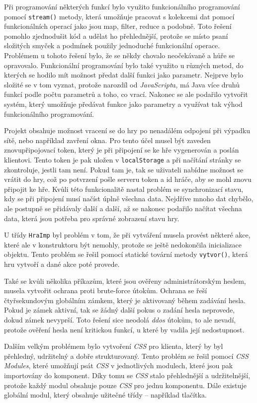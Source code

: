 Při programování některých funkcí bylo využito funkcionálního programování pomocí \texttt{stream()} metody, která umožňuje pracovat s kolekcemi dat pomocí funkcionálních operací jako jsou map, filter, reduce a podobně. Toto řešení pomohlo zjednodušit kód a udělat ho přehlednější, protože se místo psaní složitých smyček a podmínek použily jednoduché funkcionální operace. Problémem u tohoto řešení bylo, že se někdy chovalo neočekávaně a hůře se opravovalo. Funkcionální programování bylo také využito u různých metod, do kterých se hodilo mít možnost předat další funkci jako parametr. Nejprve bylo složité se v tom vyznat, protože narozdíl od \emph{JavaScript}u, má Java více druhů funkcí podle počtu parametrů a toho, co vrací. Nakonec se ale podařilo vytvořit systém, který umožňuje předávat funkce jako parametry a využívat tak výhod funkcionálního programování.

Projekt obsahuje možnost vracení se do hry po nenadálém odpojení při výpadku sítě, nebo například zavření okna. Pro tento účel musel být zaveden znovupřipojovací token, který je při připojení se ke hře vygenerován a poslán klientovi. Tento token je pak uložen v \texttt{localStorage} a při načítání stránky se zkontroluje, jestli tam není. Pokud tam je, tak se uživateli nabídne možnost se vrátit do hry, což po potvrzení pošle serveru token a id hráče, aby se mohl znovu připojit ke hře. Kvůli této funkcionalitě nastal problém se synchronizací stavu, kdy se při připojení musí načíst úplně všechna data. Nejdříve mnoho dat chybělo, ale postupně se přidávaly další a další, až se nakonec podařilo načítat všechna data, která jsou potřeba pro správné zobrazení stavu hry.

U třídy \texttt{HraImp} byl problém v tom, že při vytváření musela provést některé akce, které ale v konstruktoru být nemohly, protože se ještě nedokončila inicializace objektu. Tento problém se řešil pomocí statické tovární metody \texttt{vytvor()}, která hru vytvoří a dané akce poté provede.

Také se kvůli několika příkazům, které jsou ověřeny administrátorským heslem, musela vytvořit ochrana proti brute-force útokům. Ochrana se řeší čtyřsekundovým globálním zámkem, který je aktivovaný během zadávání hesla. Pokud je zámek aktivní, tak se žádný další pokus o zadání hesla neprovede, dokud zámek nevyprší. Toto řešení sice neodolá \emph{ddos} útokům, to ale nevadí, protože ověření hesla není kritickou funkcí, u které by vadila její nedostupnost.

Dalším velkým problémem bylo vytvoření \emph{CSS} pro klienta, který by byl přehledný, udržitelný a dobře strukturovaný. Tento problém se řešil pomocí \emph{CSS Modules}, které umožňují psát \emph{CSS} v jednotlivých modulech, které jsou pak importovány do komponent. Díky tomu se \emph{CSS} stalo přehlednější a udržitelnější, protože každý modul obsahuje pouze \emph{CSS} pro jednu komponentu. Dále existuje globální modul, který obsahuje užitečné třídy -- například tlačítka.


